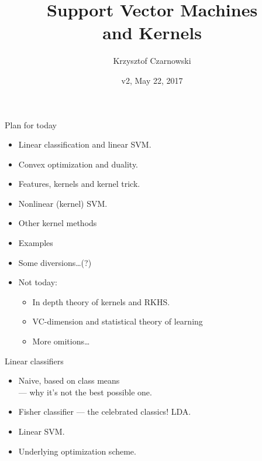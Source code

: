 \documentclass[handout]{beamer}   %
\title[SVM]{Support Vector Machines\\
  and Kernels}
\author{Krzysztof Czarnowski}
\date{v2, May 22, 2017}
\begin{document}
\begin{frame}
  \titlepage
\end{frame}


\begin{frame}{Plan for today}
  \begin{itemize}
  \item Linear classification and linear SVM.
  \item Convex optimization and duality.
  \item Features, kernels and kernel trick.
  \item Nonlinear (kernel) SVM.
  \item Other kernel methods
  \item Examples
  \item Some diversions\/\dots (?)
  \item Not today:
    \begin{itemize}
    \item In depth theory of kernels and RKHS.
    \item VC-dimension and statistical theory of learning
      \item More omitions\/\dots
    \end{itemize}
  \end{itemize}
\end{frame}


\begin{frame}{Linear classifiers}
  \begin{itemize}
  \item Naive, based on class means \\
    --- why it's not the best possible one.
  \item Fisher classifier --- the celebrated classics! LDA.
  \item Linear SVM.
  \item Underlying optimization scheme.
  \end{itemize}
\end{frame}
\end{document}
